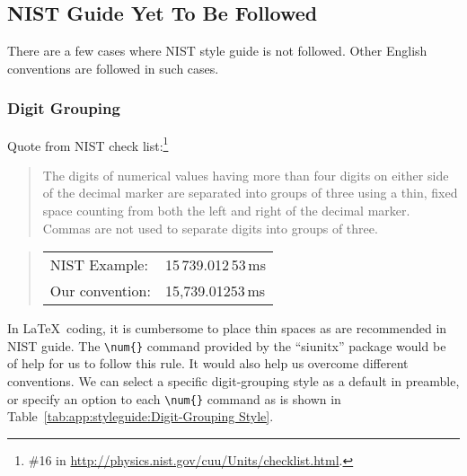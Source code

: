 \subsection{NIST Guide Yet To Be Followed}
\label{sec:app:styleguide:NIST Guides Yet To Be Followed}

There are a few cases where NIST style guide is not followed.
Other English conventions are followed in such cases.

\subsubsection{Digit Grouping}
\label{sec:app:styleguide:Digit Grouping}

Quote from NIST check list:\footnote{
  \#16 in \url{http://physics.nist.gov/cuu/Units/checklist.html}.
}

\begin{quote}
  The digits of numerical values having more than four digits on either
  side of the decimal marker are separated into groups of three using
  a thin, fixed space counting from both the left and right of the decimal
  marker. Commas are not used to separate digits into groups of three.
\end{quote}

\begin{quote}
\begin{tabular}{ll}
  NIST Example:& 15\,739.012\,53\,ms\\
  Our convention:& 15,739.01253\,ms\\
\end{tabular}
\end{quote}

In \LaTeX\ coding, it is cumbersome to place thin spaces as are recommended
in NIST guide. The \verb|\num{}| command provided by the ``siunitx''
package would be of help for us to follow this rule.
It would also help us overcome different conventions.
We can select a specific digit-grouping style as
a default in preamble, or specify an option to each \verb|\num{}|
command as is shown in
Table~\ref{tab:app:styleguide:Digit-Grouping Style}.

